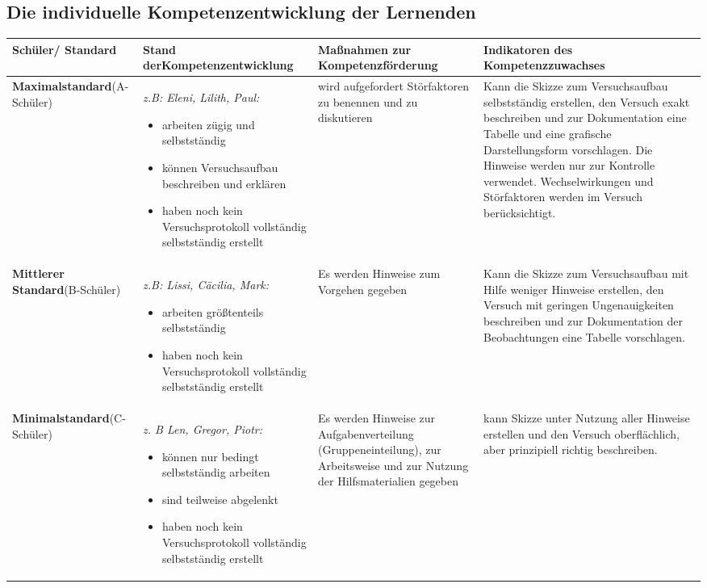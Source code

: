 \subsection{Die individuelle Kompetenzentwicklung der Lernenden}
\begin{table}[H]
\small
\singlespacing
\begin{tabularx}{\textwidth}{p{2.0cm}XXX}
\toprule
\textbf{Schüler/ Standard} & \textbf{Stand der\newline Kompetenzen\-twicklung} & \textbf{Maßnahmen zur Kompetenzförderung} & \textbf{Indikatoren des Kompetenzzuwachses} \\
\midrule
\textbf{Maximal\-standard}\newline(A-Schüler) &  \textit{z.B: Eleni, Lilith, Paul:} 
\begin{itemize}
\item arbeiten zügig und selbstständig
\item können Versuchsaufbau beschreiben und erklären
\item haben noch kein Versuchsprotokoll vollstän\-dig selbstständig erstellt 
\end{itemize}
&  wird aufgefordert Störfaktoren zu benennen und zu diskutieren
& Kann die Skizze zum Versuchsaufbau selbstständig erstellen, den Versuch exakt beschreiben und zur Dokumentation eine Tabelle und eine grafische Darstellungsform vorschlagen. Die Hinweise werden nur zur Kontrolle verwendet. Wechselwirkungen und Störfaktoren werden im Versuch berücksichtigt.\\ \addlinespace[.5em]
\midrule  \addlinespace[.5em]
\textbf{Mittlerer Standard}\newline(B-Schüler) & \textit{z.B: Lissi, Cäcilia, Mark:} 
%
\begin{itemize}
\item arbeiten größtenteils selbstständig
\item haben noch kein Versuchsprotokoll vollstän\-dig selbstständig erstellt 
\end{itemize}
  & Es werden Hinweise zum Vorgehen gegeben & Kann die Skizze zum Versuchsaufbau mit Hilfe weniger Hinweise erstellen, den Versuch mit geringen Ungenauigkeiten beschreiben und zur Dokumentation der Beobachtungen  eine Tabelle vorschlagen.\\ \addlinespace[.5em]
\midrule  \addlinespace[.5em]
\textbf{Minimal\-standard}\newline(C-Schüler) & 
\textit{z. B Len, Gregor, Piotr:}
\begin{itemize}
\item können nur bedingt selbstständig arbeiten
\item sind teilweise abgelenkt
\item haben noch kein Versuchsprotokoll vollstän\-dig selbstständig erstellt 
\end{itemize}
& Es werden Hinweise zur Aufgabenverteilung (Gruppeneinteilung), zur Arbeitsweise und zur Nutzung der Hilfsmaterialien gegeben  & kann Skizze unter Nutzung aller Hinweise erstellen und den Versuch oberflächlich, aber prinzipiell richtig beschreiben. \\
\bottomrule
\end{tabularx}
\end{table}
%
